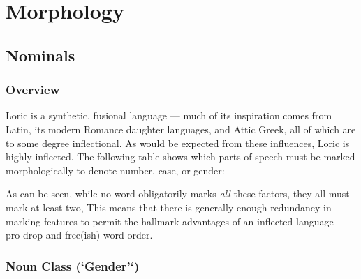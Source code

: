 \documentclass[oneside]{book}
\begin{document}
\tableofcontents



\part{Morphology}
\chapter{Nominals}
\section{Overview}

Loric is a synthetic, fusional language --- much of its inspiration comes from Latin, its modern Romance daughter languages, and Attic Greek, all of which are to some degree inflectional. As would be expected from these influences, Loric is highly inflected. The following table shows which parts of speech must be marked morphologically to denote number, case, or gender:

{
\begin{center}
\end{center}
}
As can be seen, while no word obligatorily marks \textit{all} these factors, they all must mark at least two, This means that there is generally enough redundancy in marking features to permit the hallmark advantages of an inflected language - pro-drop and free(ish) word order.


\section{Noun Class (`Gender'`)}
\end{document}

